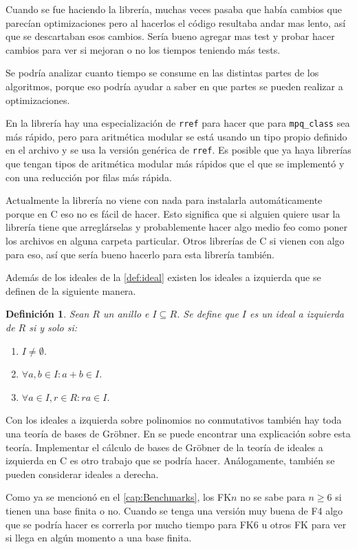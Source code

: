 \documentclass[12pt]{report}
\theoremstyle{customstyle}
\newtheorem{definition}[theorem]{Definición}
\theoremstyle{factstyle}
\newcommand\cpp{C\nolinebreak[4]\hspace{-.05em}\raisebox{.4ex}{\relsize{-3}{\textbf{++}}}\xspace}
\begin{document}
Cuando se fue haciendo la librería, muchas veces pasaba que había cambios que parecían optimizaciones pero al hacerlos el código resultaba andar mas lento, así que se descartaban esos cambios. Sería bueno agregar mas test y probar hacer cambios para ver si mejoran o no los tiempos teniendo más tests.

Se podría analizar cuanto tiempo se consume en las distintas partes de los algoritmos, porque eso podría ayudar a saber en que partes se pueden realizar a optimizaciones.

En la librería hay una especialización de \texttt{rref} para hacer que para \texttt{mpq\_class} sea más rápido, pero para aritmética modular se está usando un tipo propio definido en el archivo  y se usa la versión genérica de \texttt{rref}. Es posible que ya haya librerías que tengan tipos de aritmética modular más rápidos que el que se implementó y con una reducción por filas más rápida.

Actualmente la librería no viene con nada para instalarla automáticamente porque en \cpp eso no es fácil de hacer. Esto significa que si alguien quiere usar la librería tiene que arreglárselas y probablemente hacer algo medio feo como poner los archivos en alguna carpeta particular. Otros librerías de \cpp si vienen con algo para eso, así que sería bueno hacerlo para esta librería también.

Además de los ideales de la \cref{def:ideal} existen los ideales a izquierda que se definen de la siguiente manera.
\begin{definition}
  Sean $R$ un anillo e $I ⊆ R$. Se define que $I$ es un ideal a izquierda de $R$ si y solo si:
  \begin{enumerate}
    \item $I ≠ ∅$.
    \item $∀a, b ∈ I : a + b ∈ I$.
    \item $∀a ∈ I, r ∈ R : r a ∈ I$.
  \end{enumerate}
\end{definition}
\noindent Con los ideales a izquierda sobre polinomios no conmutativos también hay toda una teoría de bases de Gröbner. En \cite{phdthesis:Hof23} se puede encontrar una explicación sobre esta teoría. Implementar el cálculo de bases de Gröbner de la teoría de ideales a izquierda en \cpp es otro trabajo que se podría hacer. Análogamente, también se pueden considerar ideales a derecha.

Como ya se mencionó en el \cref{cap:Benchmarks}, los FK$n$ no se sabe para $n ≥ 6$ si tienen una base finita o no. Cuando se tenga una versión muy buena de F4 algo que se podría hacer es correrla por mucho tiempo para FK6 u otros FK para ver si llega en algún momento a una base finita.
\end{document}
